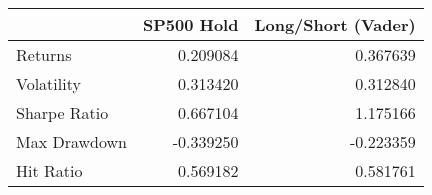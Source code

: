 \begin{tabular}{lrr}
\toprule
{} &  SP500 Hold &  Long/Short (Vader) \\
\midrule
Returns      &    0.209084 &            0.367639 \\
Volatility   &    0.313420 &            0.312840 \\
Sharpe Ratio &    0.667104 &            1.175166 \\
Max Drawdown &   -0.339250 &           -0.223359 \\
Hit Ratio    &    0.569182 &            0.581761 \\
\bottomrule
\end{tabular}
